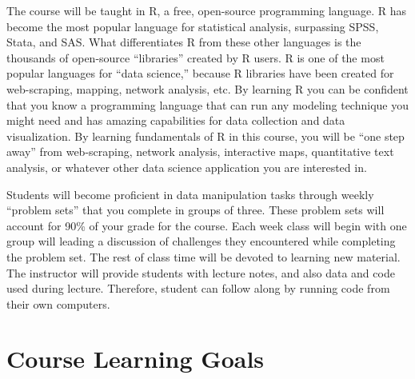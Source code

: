 \documentclass[11pt,]{article}
\begin{document}
The course will be taught in R, a free, open-source programming
language. R has become the most popular language for statistical
analysis, surpassing SPSS, Stata, and SAS. What differentiates R from
these other languages is the thousands of open-source ``libraries''
created by R users. R is one of the most popular languages for ``data
science,'' because R libraries have been created for web-scraping,
mapping, network analysis, etc. By learning R you can be confident that
you know a programming language that can run any modeling technique you
might need and has amazing capabilities for data collection and data
visualization. By learning fundamentals of R in this course, you will be
``one step away'' from web-scraping, network analysis, interactive maps,
quantitative text analysis, or whatever other data science application
you are interested in.

Students will become proficient in data manipulation tasks through
weekly ``problem sets'' that you complete in groups of three. These
problem sets will account for 90\% of your grade for the course. Each
week class will begin with one group will leading a discussion of
challenges they encountered while completing the problem set. The rest
of class time will be devoted to learning new material. The instructor
will provide students with lecture notes, and also data and code used
during lecture. Therefore, student can follow along by running code from
their own computers.

\hypertarget{course-learning-goals}{%
\section{Course Learning Goals}\label{course-learning-goals}}
\end{document}

